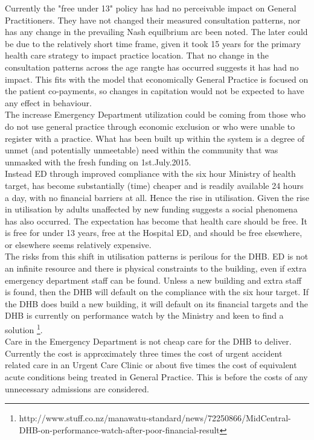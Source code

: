 \documentclass[11pt,a4paper]{article}
\begin{document}
Currently the "free under 13" policy has had no perceivable impact on General Practitioners. They have not changed their measured consultation patterns, nor has any change in the prevailing Nash equilbrium arc been noted. The later could be due to the relatively short time frame, given it took 15 years for the primary health care strategy to impact practice location. That no change in the consultation patterns across the age rangte has occurred suggests it has had no impact. This fits with the model that economically General Practice is focused on the patient co-payments, so changes in capitation would not be expected to have any effect in behaviour.\\

The increase Emergency Department utilization could be coming from those who do not use general practice through economic exclusion or who were unable to register with a practice. What has been built up within the system is a degree of unmet (and potentially unmeetable) need within the community that was unmasked with the fresh funding on 1st.July.2015.\\

Instead ED through improved compliance with the six hour Ministry of health target, has become substantially (time) cheaper and is readily available 24 hours a day, with no financial barriers at all. Hence the rise in utilisation. Given the rise in utilisation by adults unaffected by new funding suggests a social phenomena has also occurred. The expectation has become that health care should be free. It is free for under 13 years, free at the Hospital ED, and should be free elsewhere, or elsewhere seems relatively expensive. \\

The risks from this shift in utilisation patterns is perilous for the DHB. ED is not an infinite resource and there is physical constraints to the building, even if extra emergency department staff can be found. Unless a new building and extra staff is found, then the DHB will default on the compliance with the six hour target. If the DHB does build a new building, it will default on its financial targets and the DHB is currently on performance watch by the Ministry and keen to find a solution \footnote{http://www.stuff.co.nz/manawatu-standard/news/72250866/MidCentral-DHB-on-performance-watch-after-poor-financial-result}. \\

Care in the Emergency Department is not cheap care for the DHB to deliver. Currently the cost is approximately three times the cost of urgent accident related care in an Urgent Care Clinic or about five times the cost of equivalent acute conditions being treated in General Practice. This is before the costs of any unnecessary admissions are considered.\\
\end{document}
